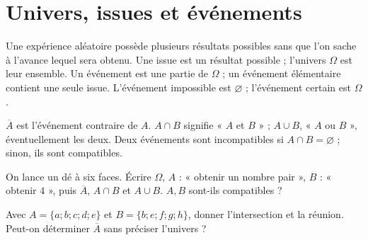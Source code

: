 \section{Univers, issues et événements}
\begin{keypoint}[Vocabulaire]
Une expérience aléatoire possède plusieurs résultats possibles sans que l'on sache à l'avance lequel sera obtenu. Une issue est un résultat possible ; l'univers $\Omega$ est leur ensemble. Un événement est une partie de $\Omega$ ; un événement élémentaire contient une seule issue.
L'événement impossible est $\varnothing$ ; l'événement certain est $\Omega$.
\end{keypoint}
\begin{keypoint}
$\overline A$ est l'événement contraire de $A$. $A\cap B$ signifie « $A$ et $B$ » ; $A\cup B$, « $A$ ou $B$ », éventuellement les deux. Deux événements sont incompatibles si $A\cap B=\varnothing$ ; sinon, ils sont compatibles.
\end{keypoint}
\begin{example}On lance un dé à six faces. Écrire $\Omega$, $A$ : « obtenir un nombre pair », $B$ : « obtenir $4$ », puis $\overline A$, $A\cap B$ et $A\cup B$. $A,B$ sont-ils compatibles ?\end{example}
\begin{example}Avec $A=\{a;b;c;d;e\}$ et $B=\{b;e;f;g;h\}$, donner l'intersection et la réunion. Peut-on déterminer $\overline A$ sans préciser l'univers ?\end{example}

